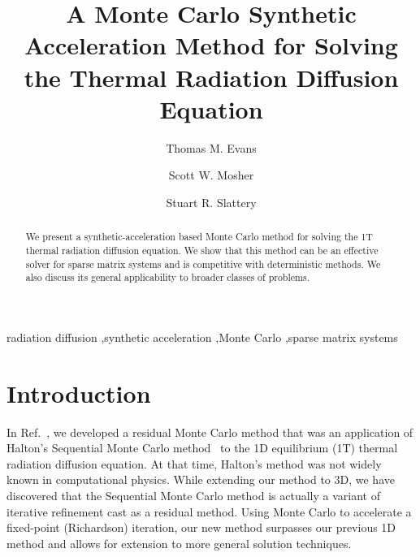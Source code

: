 \documentclass[preprint,12pt]{elsarticle}
\begin{document}
\begin{frontmatter}

  \title{A Monte Carlo Synthetic Acceleration Method for Solving the
    Thermal Radiation Diffusion Equation}

  \author[ornl]{Thomas M. Evans}

  \author[ornl]{Scott W. Mosher}

  \author[wisc]{Stuart R. Slattery}


  \address[ornl]{Oak Ridge National Laboratory, 
    1 Bethel Valley Rd., Oak Ridge, TN 378131 U.S.A.}
  \address[wisc]{University of Wisconsin-Madison, 1500 Engineering
    Dr., Madison, WI 53716 U.S.A.}

  \begin{abstract}

    We present a synthetic-acceleration based Monte Carlo method for
    solving the 1T thermal radiation diffusion equation.  We show that
    this method can be an effective solver for sparse matrix systems
    and is competitive with deterministic methods.  We also discuss
    its general applicability to broader classes of problems.

  \end{abstract}

  \begin{keyword}
    radiation diffusion \sep synthetic acceleration \sep Monte Carlo
    \sep sparse matrix systems
  \end{keyword}

\end{frontmatter}

\section{Introduction}
\label{sec:introduction}

In Ref.~\cite{evans_2003}, we developed a residual Monte Carlo method
that was an application of Halton's Sequential Monte Carlo
method~\cite{halton_1962,halton_1994} to the 1D equilibrium (1T)
thermal radiation diffusion equation.  At that time, Halton's method
was not widely known in computational physics.  While extending our
method to 3D, we have discovered that the Sequential Monte Carlo
method is actually a variant of iterative refinement cast as a
residual method.  Using Monte Carlo to accelerate a fixed-point
(Richardson) iteration, our new method surpasses our previous 1D
method and allows for extension to more general solution techniques.
\end{document}
